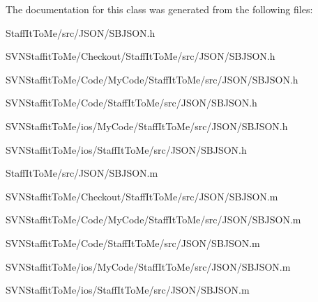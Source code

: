 \-The documentation for this class was generated from the following files\-:\begin{DoxyCompactItemize}
\item 
\-Staff\-It\-To\-Me/src/\-J\-S\-O\-N/\-S\-B\-J\-S\-O\-N.\-h\item 
\-S\-V\-N\-Staffit\-To\-Me/\-Checkout/\-Staff\-It\-To\-Me/src/\-J\-S\-O\-N/\-S\-B\-J\-S\-O\-N.\-h\item 
\-S\-V\-N\-Staffit\-To\-Me/\-Code/\-My\-Code/\-Staff\-It\-To\-Me/src/\-J\-S\-O\-N/\-S\-B\-J\-S\-O\-N.\-h\item 
\-S\-V\-N\-Staffit\-To\-Me/\-Code/\-Staff\-It\-To\-Me/src/\-J\-S\-O\-N/\-S\-B\-J\-S\-O\-N.\-h\item 
\-S\-V\-N\-Staffit\-To\-Me/ios/\-My\-Code/\-Staff\-It\-To\-Me/src/\-J\-S\-O\-N/\-S\-B\-J\-S\-O\-N.\-h\item 
\-S\-V\-N\-Staffit\-To\-Me/ios/\-Staff\-It\-To\-Me/src/\-J\-S\-O\-N/\-S\-B\-J\-S\-O\-N.\-h\item 
\-Staff\-It\-To\-Me/src/\-J\-S\-O\-N/\-S\-B\-J\-S\-O\-N.\-m\item 
\-S\-V\-N\-Staffit\-To\-Me/\-Checkout/\-Staff\-It\-To\-Me/src/\-J\-S\-O\-N/\-S\-B\-J\-S\-O\-N.\-m\item 
\-S\-V\-N\-Staffit\-To\-Me/\-Code/\-My\-Code/\-Staff\-It\-To\-Me/src/\-J\-S\-O\-N/\-S\-B\-J\-S\-O\-N.\-m\item 
\-S\-V\-N\-Staffit\-To\-Me/\-Code/\-Staff\-It\-To\-Me/src/\-J\-S\-O\-N/\-S\-B\-J\-S\-O\-N.\-m\item 
\-S\-V\-N\-Staffit\-To\-Me/ios/\-My\-Code/\-Staff\-It\-To\-Me/src/\-J\-S\-O\-N/\-S\-B\-J\-S\-O\-N.\-m\item 
\-S\-V\-N\-Staffit\-To\-Me/ios/\-Staff\-It\-To\-Me/src/\-J\-S\-O\-N/\-S\-B\-J\-S\-O\-N.\-m\end{DoxyCompactItemize}

